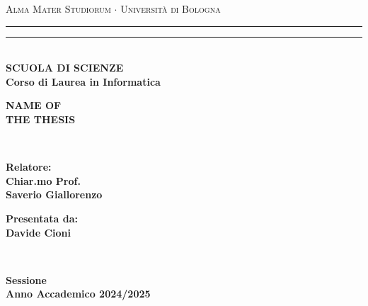 \begin{titlepage}
    \begin{center}
        {{\Large{\textsc{Alma Mater Studiorum $\cdot$ Università di Bologna}}}}
        \rule[0.1cm]{\textwidth}{0.1mm}
        \rule[0.5cm]{\textwidth}{0.6mm}\\
        {\small{\bf SCUOLA DI SCIENZE\\
            Corso di Laurea in Informatica}}
    \end{center}

    \vspace{25mm}

    \begin{center}
        {\LARGE{\bf NAME OF }}\\
        \vspace{3mm}
        {\LARGE{\bf THE THESIS }}\\
    \end{center}

    \vspace{60mm}
    \par
    \noindent
    \begin{minipage}[t]{0.04\textwidth}
        ~
    \end{minipage}
    \begin{minipage}[t]{0.4\textwidth}
        \large{\bf Relatore:\\
            Chiar.mo Prof.\\
            Saverio Giallorenzo}
        \vspace{3mm}\\
    \end{minipage}
    \hfill
    \begin{minipage}[t]{0.4\textwidth}\raggedleft
        {\large{\bf Presentata da:\\
                Davide Cioni}}
    \end{minipage}
    \begin{minipage}[t]{0.04\textwidth}
        ~
    \end{minipage}

    \vspace{30mm}

    \begin{center}
        {\large{\bf {} Sessione\\
                Anno Accademico 2024/2025 }}
    \end{center}
\end{titlepage}
